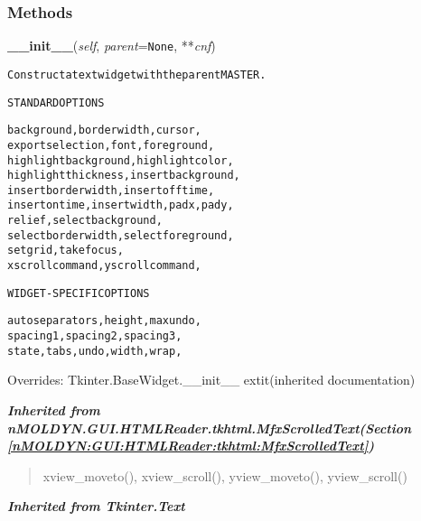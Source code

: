 
  \subsubsection{Methods}

    \vspace{0.5ex}

\hspace{.8\funcindent}\begin{boxedminipage}{\funcwidth}

    \raggedright \textbf{\_\_init\_\_}(\textit{self}, \textit{parent}={\tt None}, **\textit{cnf})

\setlength{\parskip}{2ex}
\begin{alltt}
Construct a text widget with the parent MASTER.

STANDARD OPTIONS

    background, borderwidth, cursor,
    exportselection, font, foreground,
    highlightbackground, highlightcolor,
    highlightthickness, insertbackground,
    insertborderwidth, insertofftime,
    insertontime, insertwidth, padx, pady,
    relief, selectbackground,
    selectborderwidth, selectforeground,
    setgrid, takefocus,
    xscrollcommand, yscrollcommand,

WIDGET-SPECIFIC OPTIONS

    autoseparators, height, maxundo,
    spacing1, spacing2, spacing3,
    state, tabs, undo, width, wrap,
\end{alltt}

\setlength{\parskip}{1ex}
      Overrides: Tkinter.BaseWidget.\_\_init\_\_ 	extit{(inherited documentation)}

    \end{boxedminipage}


\large{\textbf{\textit{Inherited from nMOLDYN.GUI.HTMLReader.tkhtml.MfxScrolledText\textit{(Section \ref{nMOLDYN:GUI:HTMLReader:tkhtml:MfxScrolledText})}}}}

\begin{quote}
xview\_moveto(), xview\_scroll(), yview\_moveto(), yview\_scroll()
\end{quote}

\large{\textbf{\textit{Inherited from Tkinter.Text}}}

